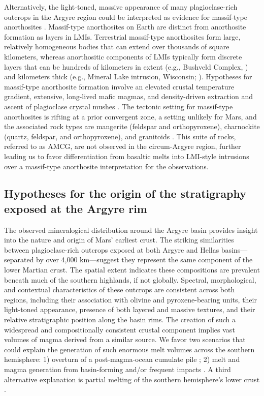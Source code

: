 \documentclass[11pt]{article}
\begin{document}
Alternatively, the light-toned, massive appearance of many plagioclase-rich outcrops in the Argyre region could be interpreted as evidence for massif-type anorthosites \citep{Ashwal1993, Arndt2013, Keller2024}. Massif-type anorthosites on Earth are distinct from anorthosite formation as layers in LMIs. Terrestrial massif-type anorthosites form large, relatively homogeneous bodies that can extend over thousands of square kilometers, whereas anorthositic components of LMIs typically form discrete layers that can be hundreds of kilometers in extent (e.g., Bushveld Complex, \citealt{Latypov2020}) and kilometers thick (e.g., Mineral Lake intrusion, Wisconsin; \citealt{Ashwal1993}). Hypotheses for massif-type anorthosite formation involve an elevated crustal temperature gradient, extensive, long-lived mafic magmas, and density-driven extraction and ascent of plagioclase crystal mushes \citep{Emslie1994, Keller2024}. The tectonic setting for massif-type anorthosites is rifting at a prior convergent zone, a setting unlikely for Mars, and the associated rock types are mangerite (feldspar and orthopyroxene), charnockite (quartz, feldspar, and orthopyroxene), and granitoids \citep{Emslie1994, Hamilton2010, Arndt2013, Keller2024}. This suite of rocks, referred to as AMCG, are not observed in the circum-Argyre region, further leading us to favor differentiation from basaltic melts into LMI-style intrusions over a massif-type anorthosite interpretation for the observations.

\subsection*{Hypotheses for the origin of the stratigraphy exposed at the Argyre rim}

The observed mineralogical distribution around the Argyre basin provides insight into the nature and origin of Mars' earliest crust. The striking similarities between plagioclase-rich outcrops exposed at both Argyre and Hellas basins---separated by over 4,000 km---suggest they represent the same component of the lower Martian crust. The spatial extent indicates these compositions are prevalent beneath much of the southern highlands, if not globally. Spectral, morphological, and contextual characteristics of these outcrops are consistent across both regions, including their association with olivine and pyroxene-bearing units, their light-toned appearance, presence of both layered and massive textures, and their relative stratigraphic position along the basin rims. The creation of such a widespread and compositionally consistent crustal component implies vast volumes of magma derived from a similar source. We favor two scenarios that could explain the generation of such enormous melt volumes across the southern hemisphere: 1) overturn of a post-magma-ocean cumulate pile \citep{Borg2003, Elkins-Tanton2005}; 2) melt and magma generation from basin-forming and/or frequent impacts \citep{Koeppel2020, Manske2021, Black2024}. A third alternative explanation is partial melting of the southern hemisphere's lower crust \citep{BonnetGibet2025, Bernadet2025}.
\end{document}
